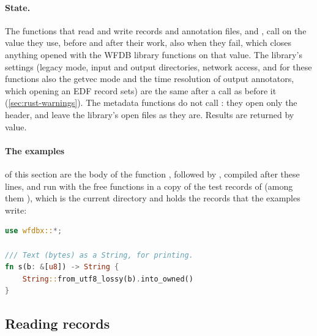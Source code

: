 \paragraph{State.} The functions that read and write records and annotation files, and
, call  on the  value they use, before
and after their work, also when they fail, which closes anything opened with the WFDB
library functions on that value. The library's settings (legacy mode, input and output
directories, network access, and for these functions also the getvec mode and the time
resolution of output annotators, which opening an EDF record sets) are the same after a
call as before it (\cref{sec:rust-warnings}). The metadata functions do not call
: they open only the header, and leave the library's open files as they
are. Results are returned by value.

\paragraph{The examples} of this section are the body of the function
, followed by ,
compiled after these lines, and run with the free functions in a copy of the test
records of  (among them ), which is the current directory and
holds the records that the examples write:
\begin{lstlisting}[language=Rust]
use wfdbx::*;

/// Text (bytes) as a String, for printing.
fn s(b: &[u8]) -> String {
    String::from_utf8_lossy(b).into_owned()
}
\end{lstlisting}

\subsection{Reading records}
\label{sec:rust-reading}

